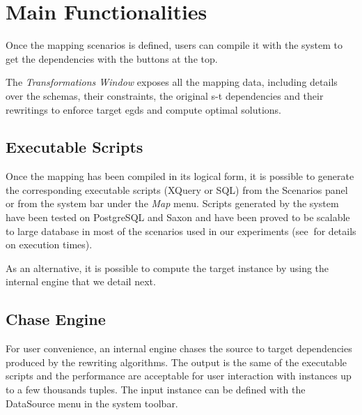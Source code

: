 \documentclass[12pt]{article}
\newcommand{\tld}{$~$}
\begin{document}

\section{Main Functionalities} \label{sec:functions}

Once the mapping scenarios is defined, users can compile it with the system to get the dependencies with the buttons at the top. 

The {\em Transformations Window} exposes all the mapping data, including details over the schemas, their constraints, the original s-t dependencies and their rewritings to enforce target egds and compute optimal solutions.

\subsection{Executable Scripts} \label{sec:scripts}

Once the mapping has been compiled in its logical form, it is possible to generate the corresponding executable scripts (XQuery or SQL) from the Scenarios panel or from the system bar under the {\em Map} menu. Scripts generated by the system have been tested on PostgreSQL and Saxon and have been proved to be scalable to large database in most of the scenarios used in our experiments (see\tld\cite{Mecca2009, Mecca2011TR,Marnette2010} for details on execution times).

As an alternative, it is possible to compute the target instance by using the internal engine that we detail next.

\subsection{Chase Engine} \label{sec:engine}

For user convenience, an internal engine chases the source to target dependencies produced by the rewriting algorithms. The output is the same of the executable scripts and the performance are acceptable for user interaction with instances up to a few thousands tuples.
The input instance can be defined with the DataSource menu in the system toolbar.
\end{document}
